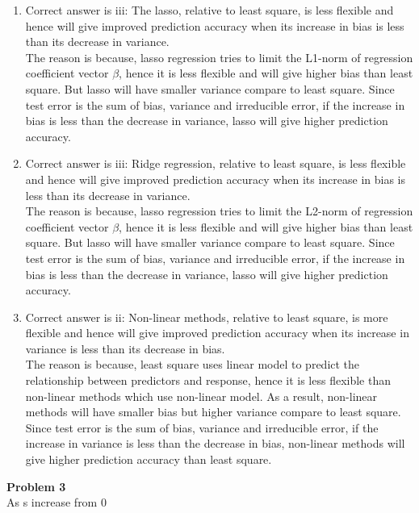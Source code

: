 \documentclass[12pt]{article}
\begin{document}
\begin{enumerate}[label=\alph*)]
   \item Correct answer is iii: The lasso, relative to least square, is less flexible and hence will give improved prediction accuracy when its increase in bias is less than its decrease in variance.\\
   The reason is because, lasso regression tries to limit the L1-norm of regression coefficient vector $\beta$, hence it is less flexible and will give higher bias than least square. But lasso will have smaller variance compare to least square. Since test error is the sum of bias, variance and irreducible error, if the increase in bias is less than the decrease in variance, lasso will give higher prediction accuracy. 
   \item Correct answer is iii: Ridge regression, relative to least square, is less flexible and hence will give improved prediction accuracy when its increase in bias is less than its decrease in variance.\\
   The reason is because, lasso regression tries to limit the L2-norm of regression coefficient vector $\beta$, hence it is less flexible and will give higher bias than least square. But lasso will have smaller variance compare to least square. Since test error is the sum of bias, variance and irreducible error, if the increase in bias is less than the decrease in variance, lasso will give higher prediction accuracy.
   \item
   Correct answer is ii: Non-linear methods, relative to least square, is more flexible and hence will give improved prediction accuracy when its increase in variance is less than its decrease in bias.\\
   The reason is because, least square uses linear model to predict the relationship between predictors and response, hence it is less flexible than non-linear methods which use non-linear model. As a result, non-linear methods will have smaller bias but higher variance compare to least square. Since test error is the sum of bias, variance and irreducible error, if the increase in variance is less than the decrease in bias, non-linear methods will give higher prediction accuracy than least square.   
\end{enumerate} 
\textbf{Problem 3}\\
   As s increase from 0
\end{document}
